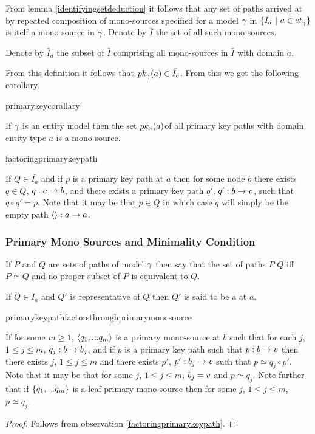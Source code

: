 From lemma \ref{identifyingsetdeduction} it follows that any set of paths arrived at by repeated composition of mono-sources specified for a model $\gamma$ in $\left\{I_a \ \middle|\ a \in et_{\gamma}\right\}$ is itelf a mono-source in $\gamma$. Denote by $\bar{I}$ the set  of all such mono-sources.

Denote by $\bar{I}_a$ the subset of $\bar{I}$ comprising all mono-sources in $\bar{I}$ with domain $a$.

From this definition it follows that $pk_{\gamma}(a) \in \bar{I_a}$. From this we get the following corollary.

primarykeycorallary
\begin{corollary}
\label{primarykeycorallary}
If $\gamma$ is an entity model then the set $pk_{\gamma}(a)$of all primary key paths 
with domain entity type $a$ is a mono-source.
\end{corollary}

factoringprimarykeypath
\begin{observation}
\label{factoringprimarykeypath}
If $Q \in \bar{I_a}$ and if $p$ is a primary key path at $a$ then for some node $b$ there exists $q \in Q$, $q: a \rightarrow b$, and there exists 
a primary key path $q'$, $q': b \rightarrow v$,  such that $q \circ q' = p$. 
Note that it may be that $p \in Q$ in which case $q$ will simply be the empty path $\langle\rangle:a \rightarrow a$.
\end{observation}

\subsubsection{Primary Mono Sources and Minimality Condition}
\label{minimalitycondition}

\begin{definition}
If $P$ and $Q$ are sets of paths of model $\gamma$ then say that the set of paths $P$ 
 $Q$ 
iff $P \simeq Q$ and no proper subset of $P$ is equivalent to $Q$.
\end{definition}

\begin{definition}
If $Q \in \bar{I}_a$ and $Q'$ is representative of $Q$ then $Q'$ is said to be
a  at $a$. 
\end{definition}

primarykeypathfactorsthroughprimarymonosource
\begin{lemma}
\label{primarykeypathfactorsthroughprimarymonosource}
If for some $m \geq 1$, $\langle q_1,...q_m\rangle$ is a primary mono-source at $b$ such that for each $j$, $1 \leq j \leq m$, $q_j : b \rightarrow b_j$,
and if  $p$ is a primary key path such that $p: b \rightarrow v$   
then there exists $j$, $1 \leq j \leq m$ and there exists $p'$, $p': b_j \rightarrow v$ such that $p \simeq q_j \circ p'$.
Note that it may be that for some $j$, $1 \leq j \leq m$, $b_j = v$ and $p \simeq q_j$.
Note further that if $\left\{q_1,...q_m\right\}$ is a leaf primary mono-source then for some $j$, $1 \leq j \leq m$, $p \simeq q_j$.
\end{lemma}
\begin{proof}
Follows from observation \ref{factoringprimarykeypath}.
\end{proof}

